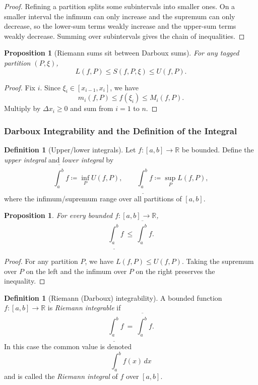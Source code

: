 \documentclass[12pt]{article}
\numberwithin{equation}{section}
\def\diff{d}
\newcommand{\RR}{\mathbb{R}}
\newcommand{\diff}{\mathop{}\!\mathrm{d}}    %
\theoremstyle{plain}
\newtheorem{proposition}[theorem]{Proposition}
\theoremstyle{definition}
\newtheorem{definition}[theorem]{Definition}
\theoremstyle{remark}
\begin{document}
\begin{proof}
Refining a partition splits some subintervals into smaller ones.
On a smaller interval the infimum can only increase and the supremum can only decrease, so the lower-sum terms weakly increase and the upper-sum terms weakly decrease.
Summing over subintervals gives the chain of inequalities.
\end{proof}

\begin{proposition}[Riemann sums sit between Darboux sums]\label{prop:between}
For any tagged partition $(P,\xi)$,
\[
L(f,P)\le S(f,P,\xi)\le U(f,P).
\]
\end{proposition}

\begin{proof}
Fix $i$. Since $\xi_i\in[x_{i-1},x_i]$, we have
\[
m_i(f,P)\le f(\xi_i)\le M_i(f,P).
\]
Multiply by $\Delta x_i\ge 0$ and sum from $i=1$ to $n$.
\end{proof}

\subsubsection{Darboux Integrability and the Definition of the Integral}

\begin{definition}[Upper/lower integrals]\label{def:upper-lower-integrals}
Let $f:[a,b]\to\RR$ be bounded.
Define the \emph{upper integral} and \emph{lower integral} by
\[
\overline{\int_a^b} f \coloneqq \inf_{P} U(f,P),
\qquad
\underline{\int_a^b} f \coloneqq \sup_{P} L(f,P),
\]
where the infimum/supremum range over all partitions of $[a,b]$.
\end{definition}

\begin{proposition}\label{prop:lower-le-upper}
For every bounded $f:[a,b]\to\RR$,
\[
\underline{\int_a^b} f \ \le\ \overline{\int_a^b} f.
\]
\end{proposition}

\begin{proof}
For any partition $P$, we have $L(f,P)\le U(f,P)$.
Taking the supremum over $P$ on the left and the infimum over $P$ on the right preserves the inequality.
\end{proof}

\begin{definition}[Riemann (Darboux) integrability]\label{def:riemann-int}
A bounded function $f:[a,b]\to\RR$ is \emph{Riemann integrable} if
\[
\underline{\int_a^b} f \ =\ \overline{\int_a^b} f.
\]
In this case the common value is denoted
\[
\int_a^b f(x)\,\diff x
\]
and is called the \emph{Riemann integral} of $f$ over $[a,b]$.
\end{definition}
\end{document}
